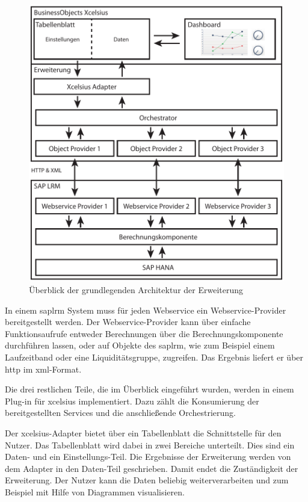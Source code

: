 \begin{onehalfspacing}
\begin{figure}[ht]
\centering
\setlength{\unitlength}{1mm}
\includegraphics[width=15cm]{images/Abbildung11-Architektur-Erweiterung.pdf}
\caption{Überblick der grundlegenden Architektur der Erweiterung\label{fig:ueberblick-architektur}}
\end{figure}

In einem \gls{saplrm} System muss für jeden Webservice ein Webservice-Provider bereitgestellt werden. Der Webservice-Provider kann über einfache Funktionsaufrufe entweder Berechnungen über die Berechnungskomponente durchführen lassen, oder auf Objekte des \gls{saplrm}, wie zum Beispiel einem Laufzeitband oder eine Liquiditätsgruppe, zugreifen. Das Ergebnis liefert er über \gls{http} im \gls{xml}-Format.

Die drei restlichen Teile, die im Überblick eingeführt wurden, werden in einem Plug-in für \gls{xcelsius} implementiert. Dazu zählt die Konsumierung der bereitgestellten Services und die anschließende Orchestrierung.

Der \gls{xcelsius}-Adapter bietet über ein Tabellenblatt die Schnittstelle für den Nutzer. Das Tabellenblatt wird dabei in zwei Bereiche unterteilt. Dies sind ein Daten- und ein Ein\-stel\-lungs-Teil. Die Ergebnisse der Erweiterung werden von dem Adapter in den Daten-Teil geschrieben. Damit endet die Zuständigkeit der Erweiterung. Der Nutzer kann die Daten beliebig weiterverarbeiten und zum Beispiel mit Hilfe von Diagrammen visualisieren.


\end{onehalfspacing}

